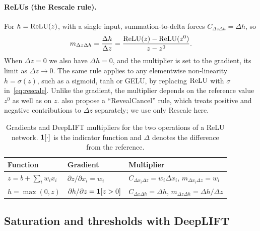 \paragraph{ReLUs (the Rescale rule).} For $h=\operatorname{ReLU}(z)$, with a single input, summation-to-delta forces $C_{\Delta z\Delta h}=\Delta h$, so
\begin{equation}
  m_{\Delta z\Delta h} = \frac{\Delta h}{\Delta z} = \frac{\operatorname{ReLU}(z)-\operatorname{ReLU}(z^0)}{z-z^0}.
  \label{eq:rescale}
\end{equation}
When $\Delta z=0$ we also have $\Delta h=0$, and the multiplier is set to the gradient, its limit as $\Delta z\to 0$. The same rule applies to any elementwise non-linearity $h=\sigma(z)$, such as a sigmoid, tanh or GELU, by replacing $\operatorname{ReLU}$ with $\sigma$ in~\eqref{eq:rescale}. Unlike the gradient, the multiplier depends on the reference value $z^0$ as well as on $z$. \citet{shrikumar2017} also propose a ``RevealCancel'' rule, which treats positive and negative contributions to $\Delta z$ separately; we use only Rescale here.

\begin{table}[t]
  \centering
  \caption{Gradients and DeepLIFT multipliers for the two operations of a ReLU network. $\mathbf{1}[\cdot]$ is the indicator function and $\Delta$ denotes the difference from the reference.}
  \label{tab:mult_rules}
  \begin{tabular}{lll}
    \toprule
    Function & Gradient & Multiplier \\
    \midrule
    $z=b+\sum_iw_ix_i$ & $\partial z/\partial x_i = w_i$ & $C_{\Delta x_i\Delta z}=w_i\Delta x_i$, \quad $m_{\Delta x_i\Delta z}=w_i$ \\[2pt]
    $h=\max(0,z)$ & $\partial h/\partial z=\mathbf{1}[z>0]$ & $C_{\Delta z\Delta h}=\Delta h$, \quad $m_{\Delta z\Delta h}=\Delta h/\Delta z$ \\
    \bottomrule
  \end{tabular}
\end{table}

\subsection{Saturation and thresholds with DeepLIFT}


